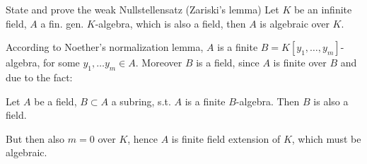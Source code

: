 State and prove the weak Nullstellensatz (Zariski's lemma)
Let \(K\) be an infinite field, \(A\) a fin. gen. \(K\)-algebra, which is also a field,
then \(A\) is algebraic over \(K\).

According to Noether's normalization lemma, \(A\) is a finite \(B = K[y_1, \dots, y_m]\)-algebra, for some
\(y_1, \dots y_m \in A\). Moreover \(B\) is a field, since \(A\) is finite over \(B\) and due to the fact:

Let \(A\) be a field, \(B \subset A\) a subring, s.t. \(A\) is a finite \(B\)-algebra. Then \(B\) is also a field.

But then also \(m = 0\) over \(K\), hence \(A\) is finite field extension of \(K\), which must be algebraic.

